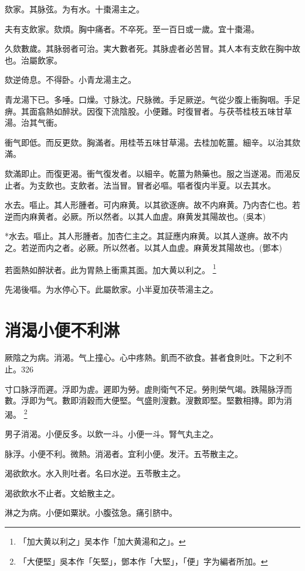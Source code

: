 \documentclass[12pt,twoside,UTF8,b5paper]{ctexbook}
\begin{document}
欬家。其脉弦。为有水。十棗湯主之。

夫有支飲家。欬煩。胸中痛者。不卒死。至一百日{或}一歲。宜十棗湯。

久欬數歲。其脉弱者可治。実大數者死。其脉虗者必苦冒。其人本有支飲在胸中故也。治屬飲家。

欬逆倚息。{不得卧。}小青龙湯主之。

青龙湯下已。多唾。口燥。寸脉沈。尺脉微。手足厥逆。气從少腹上衝胸咽。手足痹。其面翕熱如醉狀。因復下流陰股。小便難。时復冒者。与茯苓桂枝五味甘草湯。治其气衝。

衝气即低。而反更欬。胸滿者。用桂苓五味甘草湯。去桂加乾薑。細辛。以治其欬滿。

欬滿即止。而復更渴。衝气復发者。以細辛。乾薑为熱藥也。服之当遂渴。而渴反止者。为支飲也。支飲者。法当冒。冒者必嘔。嘔者復内半夏。以去其水。

水去。嘔止。其人形腫者。可内麻黄。以其欲逐痹。故不内麻黄。乃内杏仁也。若逆而内麻黄者。必厥。所以然者。以其人血虗。麻黄发其陽故也。(吳本)

*水去。嘔止。其人形腫者。加杏仁主之。其証應内麻黄。以其人遂痹。故不内之。若逆而内之者。必厥。所以然者。以其人血虗。麻黄发其陽故也。(鄧本)

若面熱如醉{狀者}。此为胃熱上衝熏其面。加大黄以利之。
	\footnote{「加大黄以利之」吴本作「加大黄湯和之」。}

先渴後嘔。为水停心下。此屬飲家。小半夏{加}茯苓湯主之。

\chapter{消渴小便{不}利淋}

厥陰之为病。消渴。气上撞{心}。心中疼熱。飢而不欲食。{甚者}食則吐。下之利不止。326

寸口脉浮而遲。浮即为虗。遲即为勞。虗則衛气不足。勞則榮气竭。跌陽脉浮而數。浮即为气。數即消穀而大{便}堅。气盛則溲數。溲數即堅。堅數相摶。即为消渴。
	\footnote{「大便堅」吳本作「矢堅」，鄧本作「大堅」，「便」字为編者所加。}

男子消渴。小便反多。以飲一斗。小便一斗。腎气丸主之。

脉浮。小便不利。微熱。消渴者。宜利小便。发汗。五苓散主之。

渴欲飲水。水入則吐者。名曰水逆。五苓散主之。

渴欲飲水不止者。文蛤散主之。

淋之为病。小便如粟狀。小腹弦急。痛引脐中。
\end{document}
